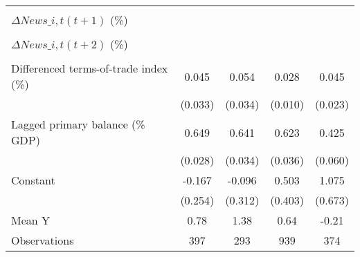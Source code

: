 {\begin{tabular}{l*{4}{c}}
                    &                     &                     &                     &                     \\
\addlinespace
$ \Delta News\_{i,t}(t+1)$ (\%)&                     &                     &                     &                     \\
                    &                     &                     &                     &                     \\
\addlinespace
$ \Delta News\_{i,t}(t+2)$ (\%)&                     &                     &                     &                     \\
                    &                     &                     &                     &                     \\
\addlinespace
Differenced terms-of-trade index (\%)&       0.045         &       0.054         &       0.028\sym{***}&       0.045\sym{*}  \\
                    &     (0.033)         &     (0.034)         &     (0.010)         &     (0.023)         \\
\addlinespace
Lagged primary balance (\% GDP)&       0.649\sym{***}&       0.641\sym{***}&       0.623\sym{***}&       0.425\sym{***}\\
                    &     (0.028)         &     (0.034)         &     (0.036)         &     (0.060)         \\
\addlinespace
Constant            &      -0.167         &      -0.096         &       0.503         &       1.075         \\
                    &     (0.254)         &     (0.312)         &     (0.403)         &     (0.673)         \\
\midrule
Mean Y              &        0.78         &        1.38         &        0.64         &       -0.21         \\
Observations        &         397         &         293         &         939         &         374         \\
\bottomrule
\end{tabular}
}
